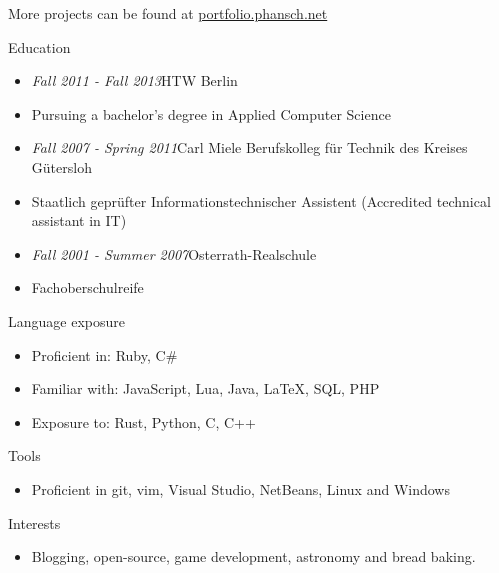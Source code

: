 \documentclass[12pt]{article}
\begin{document}
More projects can be found at \href{http://phansch.net/}{portfolio.phansch.net}

\vspace{0.5cm}
{\Large Education}

\begin{itemize}
  \setlength{\itemsep}{0cm}
  \setlength{\parskip}{0.1cm}
  \item[] \emph{Fall 2011 - Fall 2013}\hfill HTW Berlin
  \item[] Pursuing a bachelor's degree in Applied Computer Science
\end{itemize}

\begin{itemize}
  \setlength{\itemsep}{0cm}
  \setlength{\parskip}{0.1cm}
  \item[] \emph{Fall 2007 - Spring 2011}\hfill Carl Miele Berufskolleg für Technik des Kreises Gütersloh
  \item[] Staatlich geprüfter Informationstechnischer Assistent (Accredited technical assistant in IT)
\end{itemize}

\begin{itemize}
  \setlength{\itemsep}{0cm}
  \setlength{\parskip}{0.1cm}
  \item[] \emph{Fall 2001 - Summer 2007}\hfill Osterrath-Realschule
  \item[] Fachoberschulreife
\end{itemize}

\vspace{0.5cm}
{\Large Language exposure}
\begin{itemize}
  \setlength{\itemsep}{0cm}
  \setlength{\parskip}{0cm}
  \item[] Proficient in: Ruby, C\#
  \item[] Familiar with: JavaScript, Lua, Java, LaTeX, SQL, PHP
  \item[] Exposure to: Rust, Python, C, C++
\end{itemize}

\vspace{0.5cm}
{\Large Tools}
\begin{itemize}
  \setlength{\itemsep}{0cm}
  \setlength{\parskip}{0cm}
  \item[] Proficient in git, vim, Visual Studio, NetBeans, Linux and Windows
\end{itemize}

\vspace{0.5cm}
{\Large Interests}
\begin{itemize}
  \setlength{\itemsep}{0cm}
  \setlength{\parskip}{0cm}
  \item[] Blogging, open-source, game development, astronomy and bread baking.
\end{itemize}
\end{document}
